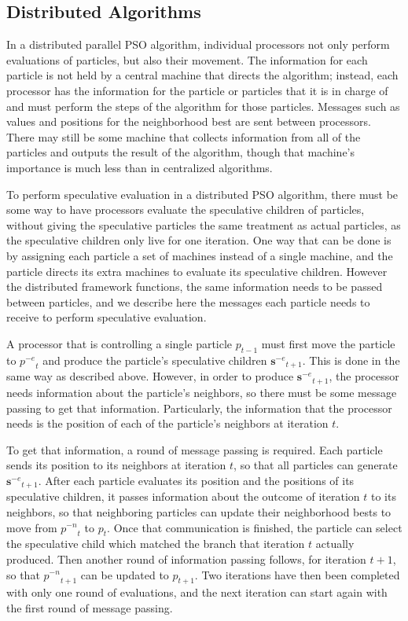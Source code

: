 \documentclass[journal,letterpaper]{IEEEtran}
\providecommand{\noeval}[1]{\ensuremath{#1^{-e}}}
\providecommand{\nonbest}[1]{\ensuremath{#1^{-n}}}
\providecommand{\p}{\ensuremath{p}}
\providecommand{\sset}{\ensuremath{\mathbf{s}}}
\begin{document}
\subsection{Distributed Algorithms}

\label{sec:distributed}

In a distributed parallel PSO algorithm, individual processors not only perform
evaluations of particles, but also their movement.  The information for each
particle is not held by a central machine that directs the algorithm; instead,
each processor has the information for the particle or particles that it is in
charge of and must perform the steps of the algorithm for those particles.
Messages such as values and positions for the neighborhood best are sent
between processors.  There may still be some machine that collects information
from all of the particles and outputs the result of the algorithm, though that
machine's importance is much less than in centralized algorithms.

To perform speculative evaluation in a distributed PSO algorithm, there must be
some way to have processors evaluate the speculative children of particles,
without giving the speculative particles the same treatment as actual
particles, as the speculative children only live for one iteration.  One way
that can be done is by assigning each particle a set of machines instead of a
single machine, and the particle directs its extra machines to evaluate its
speculative children.  However the distributed framework functions, the same
information needs to be passed between particles, and we describe here the
messages each particle needs to receive to perform speculative evaluation.

A processor that is controlling a single particle $\p_{t-1}$ must first move
the particle to $\noeval{\p}_t$ and produce the particle's speculative children
$\noeval{\sset}_{t+1}$.  This is done in the same way as described above.
However, in order to produce $\noeval{\sset}_{t+1}$, the processor needs
information about the particle's neighbors, so there must be some message
passing to get that information.  Particularly, the information that the
processor needs is the position of each of the particle's neighbors at
iteration $t$.

To get that information, a round of message passing is required.  Each particle
sends its position to its neighbors at iteration $t$, so that all particles can
generate $\noeval{\sset}_{t+1}$.  After each particle evaluates its position
and the positions of its speculative children, it passes information about the
outcome of iteration $t$ to its neighbors, so that neighboring particles can
update their neighborhood bests to move from $\nonbest{\p}_t$ to $\p_t$.  Once
that communication is finished, the particle can select the speculative child
which matched the branch that iteration $t$ actually produced.  Then another
round of information passing follows, for iteration $t+1$, so that
$\nonbest{\p}_{t+1}$ can be updated to $\p_{t+1}$.  Two iterations have then
been completed with only one round of evaluations, and the next iteration can
start again with the first round of message passing.
\end{document}
